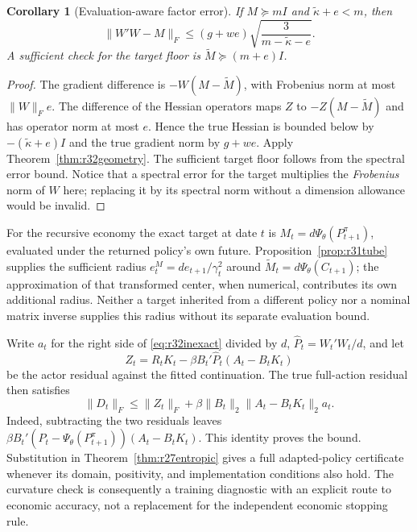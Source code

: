 \documentclass[ecta,nameyear,draft]{econsocart}
\newtheorem{corollary}[theorem]{Corollary}
\theoremstyle{definition}
\theoremstyle{remark}
\begin{document}
\begin{corollary}[Evaluation-aware factor error]\label{cor:r32inexact}
If $M\succeq mI$ and $\widetilde\kappa+e<m$, then
\begin{equation}\label{eq:r32inexact}
 \|W'W-M\|_F\leq
 (g+we)\sqrt{\frac{3}{m-\widetilde\kappa-e}}.
\end{equation}
A sufficient check for the target floor is
$\widetilde M\succeq(m+e)I$.
\end{corollary}
\begin{proof}
The gradient difference is $-W(M-\widetilde M)$, with Frobenius norm at most
$\|W\|_F e$. The difference of the Hessian operators maps $Z$ to
$-Z(M-\widetilde M)$ and has operator norm at most $e$. Hence the true
Hessian is bounded below by $-(\widetilde\kappa+e)I$ and the true gradient
norm by $g+we$. Apply Theorem~\ref{thm:r32geometry}. The sufficient target
floor follows from the spectral error bound. Notice that a spectral error
for the target multiplies the \emph{Frobenius} norm of $W$ here; replacing
it by its spectral norm without a dimension allowance would be invalid.
\end{proof}

For the recursive economy the exact target at date $t$ is
$M_t=d\Psi_\theta(P_{t+1}^{\pi})$, evaluated under the returned policy's
own future. Proposition~\ref{prop:r31tube} supplies the sufficient radius
$e_t^{M}=d e_{t+1}/\gamma_t^2$ around
$\widetilde M_t=d\Psi_\theta(C_{t+1})$; the approximation of that transformed
center, when numerical, contributes its own additional radius.
Neither a target inherited from a different policy nor a nominal matrix
inverse supplies this radius without its separate evaluation bound.

Write $a_t$ for the right side of \eqref{eq:r32inexact} divided by $d$,
$\widehat P_t=W_t'W_t/d$, and let
\[
 Z_t=R_tK_t-\beta B_t'\widehat P_t(A_t-B_tK_t)
\]
be the actor residual against the fitted continuation. The true full-action
residual then satisfies
\begin{equation}\label{eq:r32actor}
 \|D_t\|_F\leq\|Z_t\|_F+
   \beta\|B_t\|_2\|A_t-B_tK_t\|_2 a_t.
\end{equation}
Indeed, subtracting the two residuals leaves
$\beta B_t'(\widehat P_t-\Psi_\theta(P_{t+1}^{\pi}))
(A_t-B_tK_t)$. This identity proves the bound. Substitution in
Theorem~\ref{thm:r27entropic} gives a full adapted-policy certificate whenever
its domain, positivity, and implementation conditions also hold. The curvature
check is consequently a training diagnostic with an explicit route to economic
accuracy, not a replacement for the independent economic stopping rule.
\end{document}
